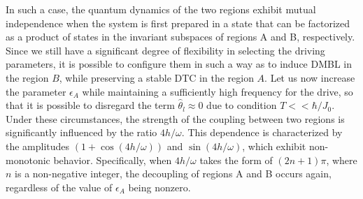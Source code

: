 \documentclass[12pt]{iopart}
\begin{document}
In such a case, the quantum dynamics of the two regions exhibit mutual independence when the system is first prepared in a state that can be factorized as a product of states in the invariant subspaces of regions A and B, respectively. Since we still have a significant degree of flexibility in selecting the driving parameters, it is possible to configure them in such a way as to induce DMBL in the region $B$, while preserving a stable DTC in the region $A$. Let us now increase the parameter $\epsilon_A$ while maintaining a sufficiently high frequency for the drive, so that it is possible to disregard the term $\hat{\theta}_l \approx 0$ due to condition $T<<\hbar/J_0$. Under these circumstances, the strength of the coupling between two regions is significantly influenced by the ratio $4h/\omega$. This dependence is characterized by the amplitudes $(1+\cos(4h/\omega))$ and $\sin(4h/\omega)$, which exhibit non-monotonic behavior. Specifically, when $4h/\omega$ takes the form of $(2n+1)\pi$, where $n$ is a non-negative integer, the decoupling of regions A and B occurs again, regardless of the value of $\epsilon_A$ being nonzero.
\end{document}
